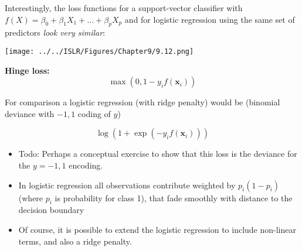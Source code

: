 \documentclass[10pt,ignorenonframetext,]{beamer}
\begin{document}
\begin{frame}

Interestingly, the loss functions for a support-vector classifier with
\(f(X)=\beta_0 + \beta_1X_1 +\ldots + \beta_pX_p\) and for logistic
regression using the same set of predictors \emph{look very similar}:
\vspace{-2mm}

\centering

\texttt{[image: ../../ISLR/Figures/Chapter9/9.12.png]}

\end{frame}

\begin{frame}

\textbf{Hinge loss:} \[\max(0,1-y_if({\boldsymbol x}_i))\]

For comparison a logistic regression (with ridge penalty) would be
(binomial deviance with \(-1,1\) coding of \(y\))

\[ \log(1+\exp(-y_i f({\boldsymbol x}_i)))\]

\begin{itemize}
\item
  Todo: Perhaps a conceptual exercise to show that this loss is the
  deviance for the \(y=-1,1\) encoding.
\item
  In logistic regression all observations contribute weighted by
  \(p_i(1-p_i)\) (where \(p_i\) is probability for class 1), that fade
  smoothly with distance to the decision boundary
\item
  Of course, it is possible to extend the logistic regression to include
  non-linear terms, and also a ridge penalty.
\end{itemize}

\end{frame}
\end{document}

